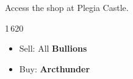 Access the shop at Plegia Castle.


\begin{shop}{1\,620}
\begin{itemize}
	\robinf
	\begin{itemize}
		\item Sell: All \textbf{Bullions}
		\item Buy: \textbf{Arcthunder}
	\end{itemize}
\end{itemize}
\end{shop}